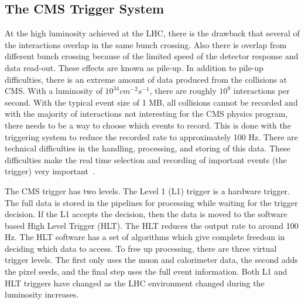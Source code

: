 \subsection{The CMS Trigger System}

At the high luminosity achieved at the LHC, there is the drawback that several of the interactions overlap in the same bunch crossing. Also there is overlap from different bunch crossing because of the limited speed of the detector response and data read-out.  These effects are known as pile-up.  In addition to pile-up difficulties, there is an extreme amount of data produced from the collisions at CMS. With a luminosity of $10^{34}cm^{-2}s^{-1}$, there are roughly $10^9$ interactions per second.  With the typical event size of 1 MB, all collisions cannot be recorded and with the majority of interactions not interesting for the CMS physics program, there needs to be a way to choose which events to record.  This is done with the triggering system to reduce the recorded rate to approximately 100 Hz. There are technical difficulties in the handling, processing, and storing of this data. These difficulties make the real time selection and recording of important events (the trigger) very important~\cite{Bayatyan:706847}.

The CMS trigger has two levels.  The Level 1 (L1) trigger is a hardware trigger.  The full data is stored in the pipelines for processing while waiting for the trigger decision.  If the L1 accepts the decision, then the data is moved to the software based High Level Trigger (HLT).  The HLT reduces the output rate to around 100 Hz. The HLT software has a set of algorithms which give complete freedom in deciding which data to access.  To free up processing, there are three virtual trigger levels.  The first only uses the muon and calorimeter data, the second adds the pixel seeds, and the final step uses the full event information. Both L1 and HLT triggers have changed as the LHC environment changed during the luminosity increases.

